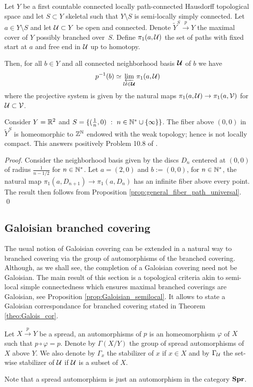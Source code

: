 \begin{prop} \label{prop:general_fiber_path_universal}
 Let $Y$ be a first countable connected locally path-connected Hausdorff topological space and let $S\subset Y$ skeletal such  that $Y\setminus S$ is semi-locally simply connected. Let $a\in Y\setminus S$ and let $\mathcal{U}\subset Y$ be open and connected.   Denote $\widetilde Y^S\xrightarrow{p} Y$ the maximal cover of $Y$ possibly branched over~$S$. Define
$\pi_1(a,\mathcal{U})$ the set of paths with fixed start at $a$ and free end in $\mathcal{U}$ up to homotopy.

Then, for all $b\in Y$ and all connected neighborhood basis $\boldsymbol {\mathcal{U}}$ of $b$ we have 
  $$ p^{-1}(b) \simeq \varprojlim_{\mathcal{U}\in \boldsymbol{\mathcal{U}}} \pi_1(a,\mathcal{U})$$
  where the projective system is given by the natural maps $\pi_1(a,\mathcal{U})\rightarrow \pi_1(a,\mathcal V)$  for $\mathcal{U}\subset \mathcal V$.
\end{prop}
  

\begin{ex}\label{ex:consider_fiber_above_homeomorphic} Consider $Y = \mathbb R^2$ and $S=\{(\frac{1}{n},0)~:~n\in \mathbb{N}^*\cup\{\infty\}\}$. The fiber above  $(0,0)$ in $\widetilde Y^S$ is homeomorphic to $\mathbb Z^{\mathbb{N}}$ endowed with the weak topology; hence is not locally compact. This answers positively Problem 10.8 of \cite{MR2198590}.
\end{ex}
\begin{proof}
 Consider the neighborhood basis given by the discs $D_n$ centered at $(0,0)$ of radius $\frac{1}{n-1/2}$ for $n\in \mathbb{N}^*$. Let $a = (2,0)$ and  $b:=(0,0)$, for $n\in \mathbb{N}^*$, the natural map $\pi_1(a,D_{n+1})\rightarrow\pi_1(a,D_{n})$ has an infinite fiber above every point. The result then follows from Proposition \ref{prop:general_fiber_path_universal}.
\qed\end{proof}



\subsection{Galoisian branched covering}\label{sec:galoisian_branched}

The usual notion of Galoisian covering can be extended in a natural way to branched covering via the group of automorphisms of the branched covering. Although, as we shall see, the completion of a Galoisian covering need not be Galoisian. The main result of this section is a topological criteria akin to semi-local simple connectedness which ensures maximal branched coverings are Galoisian, see Proposition \ref{prop:Galoisian_semilocal}. It allows to state a Galoisian correspondance for branched covering stated in Theorem \ref{theo:Galois_cor}.
\begin{defi}\label{def:automorphisms_spread} Let $X\xrightarrow{p} Y$ be a spread, an automorphisms of $p$ is an homeomorphism $\varphi$ of $X$ such that $p\circ \varphi = p$. 
Denote by  $\Gamma(X/Y)$ the group of spread automorphisms of $X$ above $Y$. 
We also denote by $\Gamma_x$ the stabilizer of $x$ if $x\in X$ and by $\Gamma_{\mathcal{U}}$ the set-wise stabilizer of $\mathcal{U}$ if $\mathcal{U}$  is a subset of $X$.
\end{defi}
Note that a spread automorphism is just an automorphism in the category $\mathbf{Spr}$.

